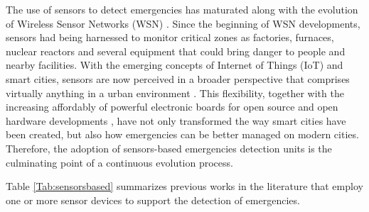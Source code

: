 \begin{refsection}
The use of sensors to detect emergencies has maturated along with the evolution of Wireless Sensor Networks (WSN) \cite{surveywsn2}. Since the beginning of WSN developments, sensors had being harnessed to monitor critical zones as factories, furnaces, nuclear reactors and several equipment that could bring danger to people and nearby facilities. With the emerging concepts of Internet of Things (IoT) and smart cities, sensors are now perceived in a broader perspective that comprises virtually anything in a urban environment \cite{smartsensing1,smartsensing3}. This flexibility, together with the increasing affordably of powerful electronic boards for open source and open hardware developments \cite{PlatformsSC}, have not only transformed the way smart cities have been created, but also how emergencies can be better managed on modern cities. Therefore, the adoption of sensors-based emergencies detection units is the culminating point of a continuous evolution process. 

Table \ref{Tab:sensorsbased} summarizes previous works in the literature that employ one or more sensor devices to support the detection of emergencies.

\begin{table}
  \centering
  \caption{Sensors-based detection of emergencies.}\label{Tab:sensorsbased}
\end{table}
\end{refsection}

